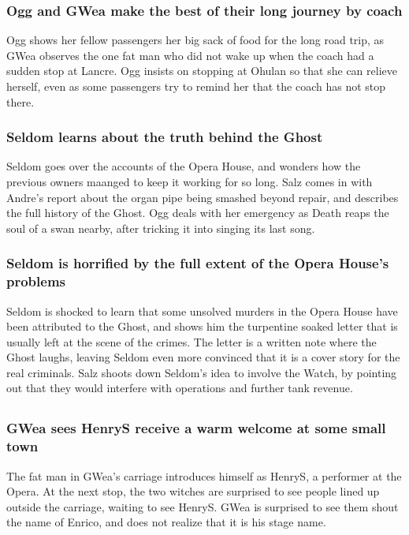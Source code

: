 \subsubsection{\Gls{Ogg} and \Gls{GWea} make the best of their long journey by coach}
\Gls{Ogg} shows her fellow passengers her big sack of food for the long road trip, as \Gls{GWea}
observes the one fat man who did not wake up when the coach had a sudden stop at Lancre. \Gls{Ogg}
insists on stopping at Ohulan so that she can relieve herself, even as some passengers try to remind
her that the coach has not stop there.

\subsubsection{\Gls{Seldom} learns about the truth behind the \Gls{Ghost}}
\Gls{Seldom} goes over the accounts of the Opera House, and wonders how the previous owners maanged
to keep it working for so long. \Gls{Salz} comes in with \Gls{Andre}'s report about the organ pipe
being smashed beyond repair, and describes the full history of the \Gls{Ghost}. \Gls{Ogg} deals with
her emergency as \Gls{Death} reaps the soul of a swan nearby, after tricking it into singing its
last song.

\subsubsection{\Gls{Seldom} is horrified by the full extent of the Opera House's problems}
\Gls{Seldom} is shocked to learn that some unsolved murders in the Opera House have been attributed
to the \Gls{Ghost}, and shows him the turpentine soaked letter that is usually left at the scene of
the crimes. The letter is a written note where the \Gls{Ghost} laughs, leaving \Gls{Seldom} even
more convinced that it is a cover story for the real criminals. \Gls{Salz} shoots down
\Gls{Seldom}'s idea to involve the Watch, by pointing out that they would interfere with operations
and further tank revenue.

\subsection{}
\subsubsection{\Gls{GWea} sees \Gls{HenryS} receive a warm welcome at some small town}
The fat man in \Gls{GWea}'s carriage introduces himself as \Gls{HenryS}, a performer at the Opera.
At the next stop, the two witches are surprised to see people lined up outside the carriage,
waiting to see \Gls{HenryS}. \Gls{GWea} is surprised to see them shout the name of \Gls{Enrico},
and does not realize that it is his stage name.


